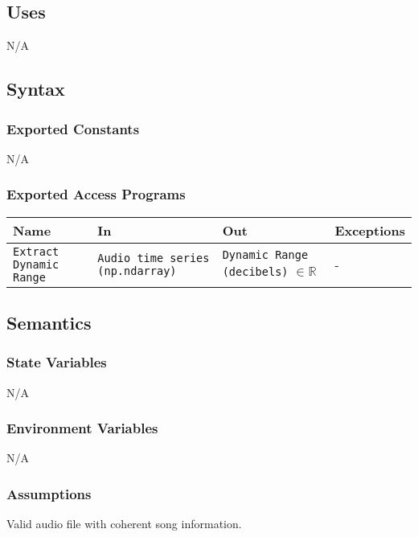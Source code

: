 \documentclass[12pt, titlepage]{article}
\begin{document}
\subsection{Uses}
N/A

\subsection{Syntax}

\subsubsection{Exported Constants}
N/A

\subsubsection{Exported Access Programs}

\begin{center}
\begin{tabular}{p{2cm} p{4cm} p{4cm} p{2cm}}
\hline
\textbf{Name} & \textbf{In} & \textbf{Out} & \textbf{Exceptions}\\
\hline%
\texttt{Extract Dynamic Range} &\texttt{Audio time series (np.ndarray)} &\texttt{Dynamic Range (decibels)} $\in \mathbb{R}$ &-\\
\hline
\end{tabular}
\end{center}

\subsection{Semantics}

\subsubsection{State Variables}
N/A

\subsubsection{Environment Variables}
N/A

\subsubsection{Assumptions}
Valid audio file with coherent song information.
\end{document}
